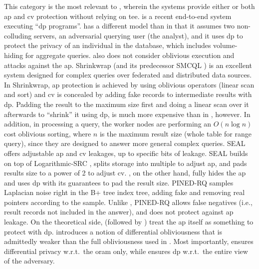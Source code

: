 			This category is the most relevant to \epsolute{}, wherein the systems provide either or both \acrshort{ap} and \acrshort{cv} protection without relying on \acrshort{tee}.
			\crypte{} \cite{crypte} is a recent end-to-end system executing ``\acrshort{dp} programs''.
			\crypte{} has a different model than \epsolute{} in that it assumes two non-colluding servers, an adversarial querying user (the analyst), and it uses \acrshort{dp} to protect the privacy of an individual in the database, which includes volume-hiding for aggregate queries.
			\crypte{} also does not consider oblivious execution and attacks against the \acrshort{ap}.
			Shrinkwrap \cite{shrinkwrap} (and its predecessor SMCQL \cite{smcql}) is an excellent system designed for complex queries over federated and distributed data sources.
			In Shrinkwrap, \acrshort{ap} protection is achieved by using oblivious operators (linear scan and sort) and \acrshort{cv} is concealed by adding fake records to intermediate results with \acrshort{dp}.
			Padding the result to the maximum size first and doing a linear scan over it afterwards to ``shrink'' it using \acrshort{dp}, is much more expensive than in \epsolute{}, however.
			In addition, in processing a query, the worker nodes are performing an $O(n \log{n})$ cost oblivious sorting, where $n$ is the maximum result size (whole table for range query), since they are designed to answer more general complex queries.
			SEAL \cite{seal} offers adjustable \acrshort{ap} and \acrshort{cv} leakages, up to specific bits of leakage.
			SEAL builds on top of Logarithmic-SRC \cite{practical-range-search}, splits storage into multiple  to adjust \acrshort{ap}, and pads results size to a power of 2 to adjust \acrshort{cv}.
			\epsolute{}, on the other hand, fully hides the \acrshort{ap} and uses \acrshort{dp} with its guarantees to pad the result size.
			PINED-RQ \cite{pined-rq} samples Laplacian noise right in the B+ tree index tree, adding fake and removing real pointers according to the sample.
			Unlike \epsolute{}, PINED-RQ allows false negatives (i.e., result records not included in the answer), and does not protect against \acrshort{ap} leakage.
			On the theoretical side, \textcite{differential-obliviousness} (followed by \textcite{differential-obliviousness-followup}) treat the \acrshort{ap} itself as something to protect with \acrshort{dp}.
			\cite{differential-obliviousness} introduces a notion of differential obliviousness that is admittedly weaker than the full obliviousness used in \epsolute{}. %
			Most importantly, \cite{differential-obliviousness} ensures differential privacy w.r.t.~the \acrshort{oram} only, while \epsolute{} ensures \acrshort{dp} w.r.t.~the entire view of the adversary. %

